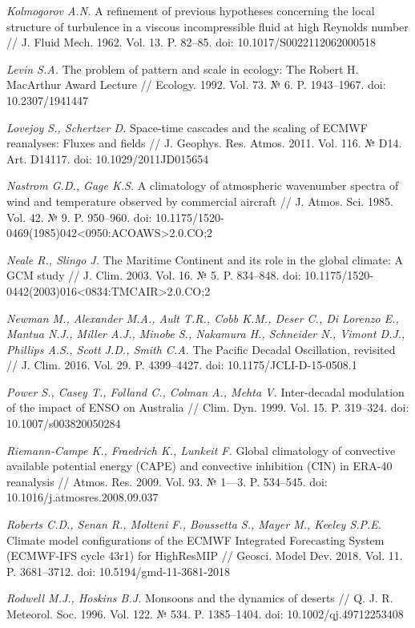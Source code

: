 \documentclass[12pt,a4paper]{article}
\begin{document}
\noindent \textit{Kolmogorov A.N.} A refinement of previous hypotheses concerning the local structure of turbulence in a viscous incompressible fluid at high Reynolds number // J. Fluid Mech. 1962. Vol. 13. P. 82–85. doi: 10.1017/S0022112062000518

\noindent \textit{Levin S.A.} The problem of pattern and scale in ecology: The Robert H. MacArthur Award Lecture // Ecology. 1992. Vol. 73. № 6. P. 1943–1967. doi: 10.2307/1941447

\noindent \textit{Lovejoy S., Schertzer D.} Space-time cascades and the scaling of ECMWF reanalyses: Fluxes and fields // J. Geophys. Res. Atmos. 2011. Vol. 116. № D14. Art. D14117. doi: 10.1029/2011JD015654

\noindent \textit{Nastrom G.D., Gage K.S.} A climatology of atmospheric wavenumber spectra of wind and temperature observed by commercial aircraft // J. Atmos. Sci. 1985. Vol. 42. № 9. P. 950–960. doi: 10.1175/1520-0469(1985)042<0950:ACOAWS>2.0.CO;2

\noindent \textit{Neale R., Slingo J.} The Maritime Continent and its role in the global climate: A GCM study // J. Clim. 2003. Vol. 16. № 5. P. 834–848. doi: 10.1175/1520-0442(2003)016<0834:TMCAIR>2.0.CO;2

\noindent \textit{Newman M., Alexander M.A., Ault T.R., Cobb K.M., Deser C., Di Lorenzo E., Mantua N.J., Miller A.J., Minobe S., Nakamura H., Schneider N., Vimont D.J., Phillips A.S., Scott J.D., Smith C.A.} The Pacific Decadal Oscillation, revisited // J. Clim. 2016. Vol. 29. P. 4399–4427. doi: 10.1175/JCLI-D-15-0508.1

\noindent \textit{Power S., Casey T., Folland C., Colman A., Mehta V.} Inter-decadal modulation of the impact of ENSO on Australia // Clim. Dyn. 1999. Vol. 15. P. 319–324. doi: 10.1007/s003820050284

\noindent \textit{Riemann-Campe K., Fraedrich K., Lunkeit F.} Global climatology of convective available potential energy (CAPE) and convective inhibition (CIN) in ERA-40 reanalysis // Atmos. Res. 2009. Vol. 93. № 1––3. P. 534–545. doi: 10.1016/j.atmosres.2008.09.037

\noindent \textit{Roberts C.D., Senan R., Molteni F., Boussetta S., Mayer M., Keeley S.P.E.} Climate model configurations of the ECMWF Integrated Forecasting System (ECMWF-IFS cycle 43r1) for HighResMIP // Geosci. Model Dev. 2018. Vol. 11. P. 3681–3712. doi: 10.5194/gmd-11-3681-2018

\noindent \textit{Rodwell M.J., Hoskins B.J.} Monsoons and the dynamics of deserts // Q. J. R. Meteorol. Soc. 1996. Vol. 122. № 534. P. 1385–1404. doi: 10.1002/qj.49712253408
\end{document}
